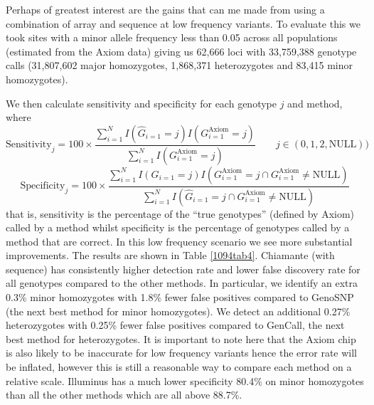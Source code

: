 Perhaps of greatest interest are the gains that can me made from using a combination of array and sequence at low frequency variants.  To evaluate this we took sites with a minor allele frequency less than 0.05 across all populations (estimated from the Axiom data) giving us 62,666 loci with 33,759,388 genotype calls (31,807,602 major homozygotes, 1,868,371 heterozygotes and 83,415 minor homozygotes). 

We then calculate sensitivity and specificity for each genotype $j$ and method, where
$$\textrm{Sensitivity}_j = 100 \times  \frac{\sum_{i=1}^N I(\hat{G}_{i=1} = j)I(G^{\textrm{Axiom}}_{i=1} = j)}{ \sum_{i=1}^N I(G^{\textrm{Axiom}}_{i=1} = j)} \qquad j \in (0,1,2,\textrm{NULL}))$$
$$\textrm{Specificity}_j = 100 \times  \frac{\sum_{i=1}^N I(G_{i=1} = j)I(G^{\textrm{Axiom}}_{i=1} = j \cap G^{\textrm{Axiom}}_{i=1} \neq \textrm{NULL})}{ \sum_{i=1}^N I(\hat{G}_{i=1} = j \cap G^{\textrm{Axiom}}_{i=1} \neq \textrm{NULL})}$$
that is, sensitivity is the percentage of the ``true genotypes'' (defined by Axiom) called by a method whilst specificity is the percentage of genotypes called by a method that are correct. 
\newpage
In this low frequency scenario we see more substantial improvements. The results are shown in Table \ref{1094tab4}. Chiamante (with sequence) has consistently higher detection rate and lower false discovery rate for all genotypes compared to the other methods.  In particular, we identify an extra 0.3\% minor homozygotes with 1.8\% fewer false positives compared to GenoSNP (the next best method for minor homozygotes).  We detect an additional 0.27\% heterozygotes with 0.25\% fewer false positives compared to GenCall, the next best method for heterozygotes. It is important to note here that the Axiom chip is also likely to be inaccurate for low frequency variants hence the error rate will be inflated, however this is still a reasonable way to compare each method on a relative scale. Illuminus has a much lower specificity 80.4\% on minor homozygotes than all the other methods which are all above 88.7\%.  
